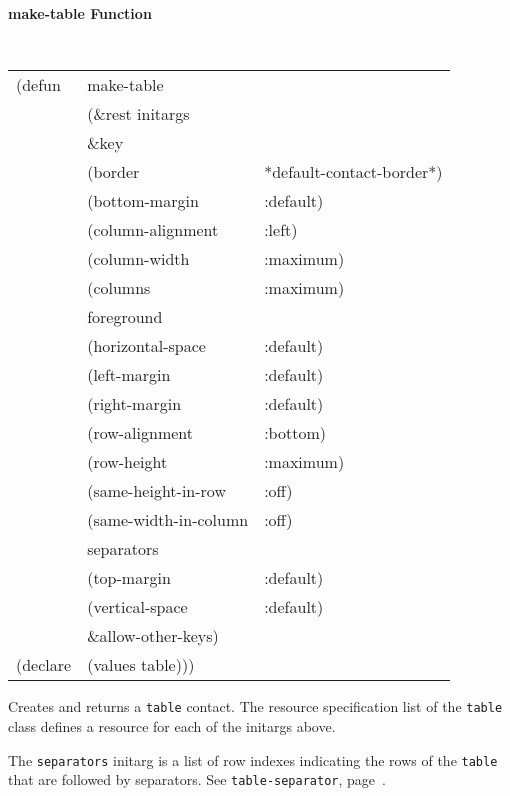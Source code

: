 {\samepage
{\large {\bf make-table \hfill Function}} 
\begin{flushright} \parbox[t]{6.125in}{
\tt
\begin{tabular}{lll}
\raggedright
(defun & make-table \\
       & (\&rest initargs \\
       & \&key  \\ 
       & (border                & *default-contact-border*) \\ 
       & (bottom-margin         & :default) \\
       & (column-alignment      & :left)\\
       & (column-width          & :maximum)\\
       & (columns               & :maximum)\\
       & foreground \\
       & (horizontal-space      & :default) \\
       & (left-margin           & :default) \\
       & (right-margin          & :default) \\
       & (row-alignment         & :bottom)\\
       & (row-height            & :maximum)\\
       & (same-height-in-row    & :off)\\
       & (same-width-in-column  & :off)\\
       & separators  & \\
       & (top-margin            & :default) \\
       & (vertical-space        & :default) \\
       & \&allow-other-keys) \\
(declare & (values   table)))
\end{tabular}
\rm

}\end{flushright}}

\begin{flushright} \parbox[t]{6.125in}{
Creates and returns a {\tt table} contact.
The resource specification list of the {\tt table} class defines
a resource for each of the initargs above.

The {\tt separators} initarg is a list of row indexes indicating the rows of the
{\tt table} that are followed by separators.
See {\tt table-separator}, page~\pageref{page:table-separator}.

 }\end{flushright}

